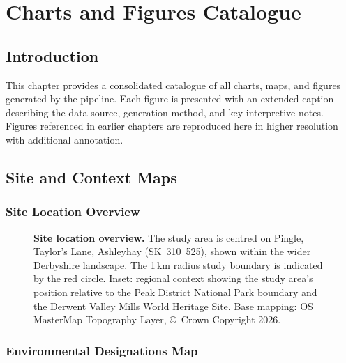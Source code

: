 \chapter{Charts and Figures Catalogue}
\label{ch:figures}

\section{Introduction}

This chapter provides a consolidated catalogue of all charts, maps, and figures generated by the \BDE{} pipeline. Each figure is presented with an extended caption describing the data source, generation method, and key interpretive notes. Figures referenced in earlier chapters are reproduced here in higher resolution with additional annotation.


\section{Site and Context Maps}

\subsection{Site Location Overview}

\begin{figure}[H]
\centering
{}
\caption[Site location overview map.]{%
\textbf{Site location overview.} The study area is centred on Pingle, Taylor's Lane, Ashleyhay (SK~310~525), shown within the wider Derbyshire landscape. The 1\,km radius study boundary is indicated by the red circle. Inset: regional context showing the study area's position relative to the Peak District National Park boundary and the Derwent Valley Mills World Heritage Site. Base mapping: OS MasterMap Topography Layer, \copyright\ Crown Copyright 2026.%
}
\label{fig:cat-site-overview}
\end{figure}

\subsection{Environmental Designations Map}

